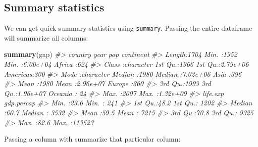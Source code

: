 \documentclass[]{book}
\newenvironment{Shaded}{\begin{snugshade}}{\end{snugshade}}
\newcommand{\CommentTok}[1]{\textcolor[rgb]{0.56,0.35,0.01}{\textit{#1}}}
\newcommand{\KeywordTok}[1]{\textcolor[rgb]{0.13,0.29,0.53}{\textbf{#1}}}
\newcommand{\NormalTok}[1]{#1}
\newcommand{\OperatorTok}[1]{\textcolor[rgb]{0.81,0.36,0.00}{\textbf{#1}}}
\newcommand{\StringTok}[1]{\textcolor[rgb]{0.31,0.60,0.02}{#1}}
\begin{document}
\begin{Shaded}
\end{Shaded}

\hypertarget{summary-statistics}{%
\subsection{Summary statistics}\label{summary-statistics}}

We can get quick summary statistics using \texttt{summary}. Passing the entire dataframe will summarize all columns:

\begin{Shaded}
\begin{Highlighting}[]
\KeywordTok{summary}\NormalTok{(gap)}
\CommentTok{#>    country               year           pop              continent  }
\CommentTok{#>  Length:1704        Min.   :1952   Min.   :6.00e+04   Africa  :624  }
\CommentTok{#>  Class :character   1st Qu.:1966   1st Qu.:2.79e+06   Americas:300  }
\CommentTok{#>  Mode  :character   Median :1980   Median :7.02e+06   Asia    :396  }
\CommentTok{#>                     Mean   :1980   Mean   :2.96e+07   Europe  :360  }
\CommentTok{#>                     3rd Qu.:1993   3rd Qu.:1.96e+07   Oceania : 24  }
\CommentTok{#>                     Max.   :2007   Max.   :1.32e+09                 }
\CommentTok{#>     life.exp      gdp.percap    }
\CommentTok{#>  Min.   :23.6   Min.   :   241  }
\CommentTok{#>  1st Qu.:48.2   1st Qu.:  1202  }
\CommentTok{#>  Median :60.7   Median :  3532  }
\CommentTok{#>  Mean   :59.5   Mean   :  7215  }
\CommentTok{#>  3rd Qu.:70.8   3rd Qu.:  9325  }
\CommentTok{#>  Max.   :82.6   Max.   :113523}
\end{Highlighting}
\end{Shaded}

Passing a column with summarize that particular column:

\begin{Shaded}
\end{Shaded}
\end{document}
